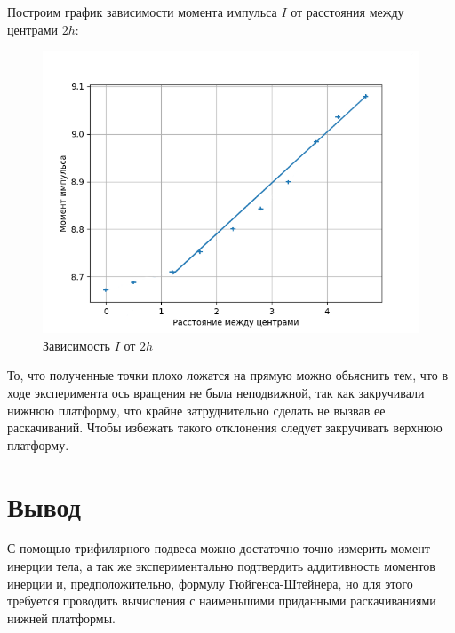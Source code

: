 \documentclass{article}
\begin{document}
\newpage
\noindent
Построим график зависимости момента импульса $I$ от расстояния между центрами $2h$:
\begin{figure}[h]
    \centering
    \includegraphics[width=0.75\linewidth]{Figure_1.png}
    \caption{Зависимость $I$ от $2h$}
\end{figure}

\noindent
То, что полученные точки плохо ложатся на прямую можно обьяснить тем, что в ходе эксперимента ось вращения не была неподвижной, так как закручивали нижнюю платформу, что крайне затруднительно сделать не вызвав ее раскачиваний. Чтобы избежать такого отклонения следует закручивать верхнюю платформу.

\section*{Вывод}

\noindent
С помощью трифилярного подвеса можно достаточно точно измерить момент инерции тела, а так же экспериментально подтвердить аддитивность моментов инерции и, предположительно, формулу Гюйгенса-Штейнера, но для этого требуется проводить вычисления с наименьшими приданными раскачиваниями нижней платформы. 
\end{document}
